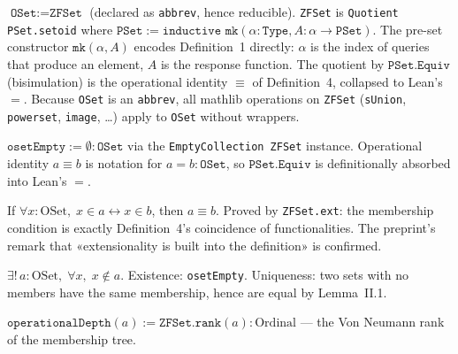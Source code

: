 \begin{definition}
\label{def:OSet}
\leanok
$\texttt{OSet} := \texttt{ZFSet}$ (declared as \texttt{abbrev}, hence
reducible).
\texttt{ZFSet} is \texttt{Quotient PSet.setoid} where $\texttt{PSet}
:= \texttt{inductive mk}(\alpha : \texttt{Type}, A : \alpha \to
\texttt{PSet})$.  The pre-set constructor $\texttt{mk}(\alpha, A)$
encodes Definition~1 directly: $\alpha$ is the index of queries that
produce an element, $A$ is the response function.  The quotient by
$\texttt{PSet.Equiv}$ (bisimulation) is the operational identity
$\equiv$ of Definition~4, collapsed to Lean's $=$.
Because \texttt{OSet} is an \texttt{abbrev}, all mathlib operations on
\texttt{ZFSet} (\texttt{sUnion}, \texttt{powerset}, \texttt{image},
\ldots) apply to \texttt{OSet} without wrappers.
\end{definition}

\begin{definition}
\label{def:osetEmpty}
\leanok
{}
$\texttt{osetEmpty} := \emptyset : \texttt{OSet}$ via the
\texttt{EmptyCollection ZFSet} instance.  Operational identity
$a \equiv b$ is notation for $a = b : \texttt{OSet}$, so
$\texttt{PSet.Equiv}$ is definitionally absorbed into Lean's $=$.
\end{definition}

\begin{theorem}
\label{thm:Lemma_II_1}
\leanok
{}
If $\forall x : \mathrm{OSet},\; x \in a \leftrightarrow x \in b$,
then $a \equiv b$.
Proved by \texttt{ZFSet.ext}: the membership condition is exactly
Definition~4's coincidence of functionalities.  The preprint's remark
that «extensionality is built into the definition» is confirmed.
\end{theorem}

\begin{theorem}
\label{thm:Lemma_II_2}
\leanok
{}
$\exists!\, a : \mathrm{OSet},\; \forall x,\; x \notin a$.
Existence: \texttt{osetEmpty}.  Uniqueness: two sets with no members
have the same membership, hence are equal by Lemma~II.1.
\end{theorem}

\begin{definition}
\label{def:operationalDepth}
\leanok
{}
$\texttt{operationalDepth}(a) := \texttt{ZFSet.rank}(a) : \mathrm{Ordinal}$
--- the Von Neumann rank of the membership tree.
\end{definition}

